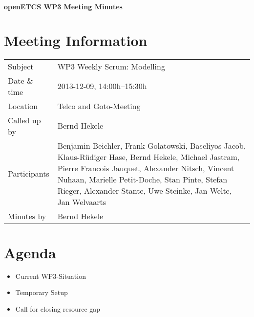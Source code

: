 \documentclass[a4paper, 11pt]{article}
\begin{document}
{\begin{center}\huge\bf openETCS WP3 Meeting Minutes\end{center}}
\section{Meeting Information}

\renewcommand{\arraystretch}{1.5}
\begin{supertabular}{m{.2\textwidth}m{.8\textwidth}}
Subject & WP3 Weekly Scrum: Modelling\\
Date \& time & 2013-12-09, 14:00h--15:30h\\
Location & Telco and Goto-Meeting\\
Called up by & Bernd Hekele\\
Participants &
Benjamin Beichler,
Frank Golatowski,
Baseliyos Jacob,
Klaus-R\"udiger Hase,
Bernd Hekele,
Michael Jastram,
Pierre Francois Jauquet,
Alexander Nitsch,
Vincent Nuhaan,
Marielle Petit-Doche,
Stan Pinte,
Stefan Rieger,
Alexander Stante,
Uwe Steinke,
Jan Welte,
Jan Welvaarts
\\

Minutes by & Bernd Hekele\\
\end{supertabular}
\renewcommand{\arraystretch}{1.0}


\section{{Agenda}}
\begin{itemize}
\item Current WP3-Situation
\item Temporary Setup
\item Call for closing resource gap
\end{itemize}
\end{document}
